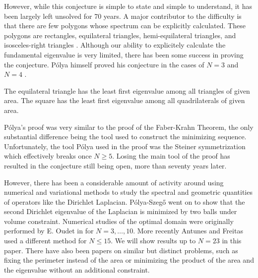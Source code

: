 However, while this conjecture is simple to state and simple to understand, it has been largely left unsolved for 70 years.
A major contributor to the difficulty is that there are few polygons whose spectrum can be explicitly calculated.
These polygons are rectangles, equilateral triangles, hemi-equilateral triangles, and isosceles-right triangles \cite{calculate}.
Although our ability to explicitely calculate the fundamental eigenvalue is very limited, there has been some success in proving the conjecture.
Pólya himself proved his conjecture in the cases of $N = 3$ and $N = 4$ \cite{henrot}.
\begin{theorem}[Pólya]
The equilateral triangle has the least first eigenvalue among all triangles of given area.
The square has the least first eigenvalue among all quadrilaterals of given area.
\end{theorem}
Pólya's proof was very similar to the proof of the Faber-Krahn Theorem, the only substantial difference being the tool used to construct the minimizing sequence.
Unfortunately, the tool Pólya used in the proof was the Steiner symmetrization which effectively breaks once $N \geq 5$.
Losing the main tool of the proof has resulted in the conjecture still being open, more than seventy years later.

However, there has been a considerable amount of activity around using numerical and variational methods to study the spectral and geometric quantities of operators like the Dirichlet Laplacian.
Pólya-Szegő went on to show that the second Dirichlet eigenvalue of the Laplacian is minimized by two balls under volume constraint.
Numerical studies of the optimal domain were originally performed by E. Oudet in \cite{oudet} for $N=3,\ldots,10$.
More recently Antunes and Freitas \cite{freitas} used a different method for $N \leq 15$.
We will show results up to $N = 23$ in this paper.
There have also been papers on similar but distinct problems, such as fixing the perimeter instead of the area or minimizing the product of the area and the eigenvalue without an additional constraint.

